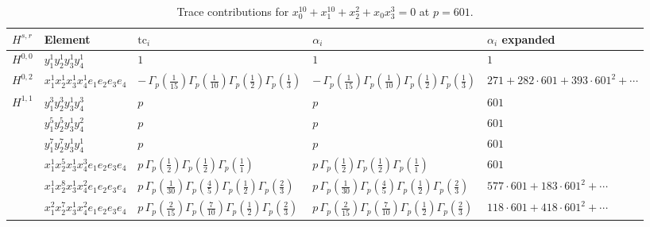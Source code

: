 \documentclass[11pt]{article}
\begin{document}
\begin{table}[ht]
\centering
\caption{Trace contributions for $x_0^{10} + x_1^{10} + x_2^{2} + x_0 x_3^{3} = 0$ at $p=601$.}\label{tab:deformed-16}
\renewcommand{\arraystretch}{1.1}
{\scriptsize
\begin{tabular}{@{}lllll@{}}
\toprule
$H^{s,r}$ & Element & $\mathrm{tc}_i$ & $\alpha_i$ & $\alpha_i$ expanded \\
\midrule
$H^{0,0}$ & $y_{1}^{1} y_{2}^{1} y_{3}^{1} y_{4}^{1}$ & $1$ & $1$ & $1$ \\
\midrule
$H^{0,2}$ & $x_{1}^{1} x_{2}^{1} x_{3}^{1} x_{4}^{1}  e_{1} e_{2} e_{3} e_{4}$ & $- \, \Gamma_p \left( \frac{1}{15} \right) \Gamma_p \left( \frac{1}{10} \right) \Gamma_p \left( \frac{1}{2} \right) \Gamma_p \left( \frac{1}{3} \right)$ & $- \, \Gamma_p \left( \frac{1}{15} \right) \Gamma_p \left( \frac{1}{10} \right) \Gamma_p \left( \frac{1}{2} \right) \Gamma_p \left( \frac{1}{3} \right)$ & $271{+}282{\cdot}601{+}393{\cdot}601^{2}{+}\cdots$ \\
\midrule
$H^{1,1}$ & $y_{1}^{3} y_{2}^{3} y_{3}^{1} y_{4}^{3}$ & $p \,$ & $p \,$ & $601$ \\
 & $y_{1}^{5} y_{2}^{5} y_{3}^{1} y_{4}^{2}$ & $p \,$ & $p \,$ & $601$ \\
 & $y_{1}^{7} y_{2}^{7} y_{3}^{1} y_{4}^{1}$ & $p \,$ & $p \,$ & $601$ \\
 & $x_{1}^{1} x_{2}^{5} x_{3}^{1} x_{4}^{3}  e_{1} e_{2} e_{3} e_{4}$ & $p \, \Gamma_p \left( \frac{1}{2} \right) \Gamma_p \left( \frac{1}{2} \right) \Gamma_p \left( \frac{1}{1} \right)$ & $p \, \Gamma_p \left( \frac{1}{2} \right) \Gamma_p \left( \frac{1}{2} \right) \Gamma_p \left( \frac{1}{1} \right)$ & $601$ \\
 & $x_{1}^{1} x_{2}^{8} x_{3}^{1} x_{4}^{2}  e_{1} e_{2} e_{3} e_{4}$ & $p \, \Gamma_p \left( \frac{1}{30} \right) \Gamma_p \left( \frac{4}{5} \right) \Gamma_p \left( \frac{1}{2} \right) \Gamma_p \left( \frac{2}{3} \right)$ & $p \, \Gamma_p \left( \frac{1}{30} \right) \Gamma_p \left( \frac{4}{5} \right) \Gamma_p \left( \frac{1}{2} \right) \Gamma_p \left( \frac{2}{3} \right)$ & $577{\cdot}601{+}183{\cdot}601^{2}{+}\cdots$ \\
 & $x_{1}^{2} x_{2}^{7} x_{3}^{1} x_{4}^{2}  e_{1} e_{2} e_{3} e_{4}$ & $p \, \Gamma_p \left( \frac{2}{15} \right) \Gamma_p \left( \frac{7}{10} \right) \Gamma_p \left( \frac{1}{2} \right) \Gamma_p \left( \frac{2}{3} \right)$ & $p \, \Gamma_p \left( \frac{2}{15} \right) \Gamma_p \left( \frac{7}{10} \right) \Gamma_p \left( \frac{1}{2} \right) \Gamma_p \left( \frac{2}{3} \right)$ & $118{\cdot}601{+}418{\cdot}601^{2}{+}\cdots$ \\

\end{tabular}}
\end{table}
\end{document}
